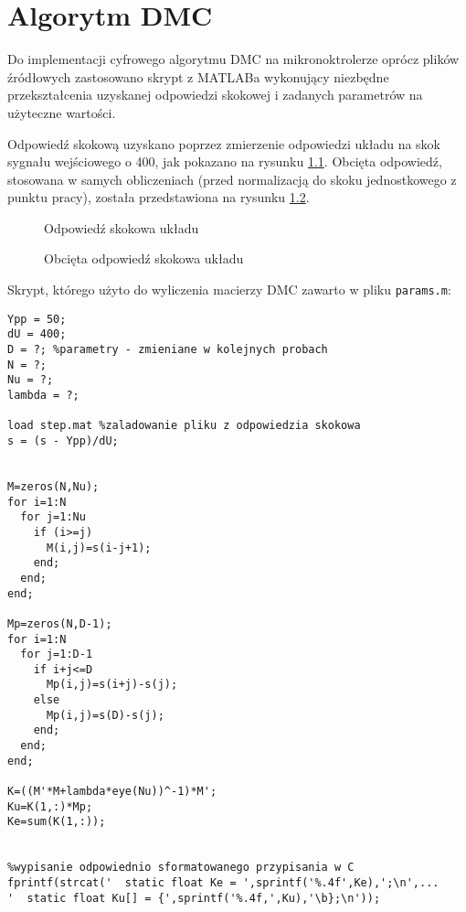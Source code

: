 \begin{figure}[H]
\centering

\end{figure}


\begin{figure}[H]
\centering

\end{figure}

\begin{figure}[H]
\centering

\end{figure}


\chapter{Algorytm DMC}

Do implementacji cyfrowego algorytmu DMC na mikronoktrolerze oprócz plików źródłowych zastosowano skrypt z MATLABa wykonujący niezbędne przekształcenia uzyskanej odpowiedzi skokowej i zadanych parametrów na użyteczne wartości.

Odpowiedź skokową uzyskano poprzez zmierzenie odpowiedzi układu na skok sygnału wejściowego o 400, jak pokazano na rysunku \ref{DMC1}. Obcięta odpowiedź, stosowana w samych obliczeniach (przed normalizacją do skoku jednostkowego z punktu pracy), została przedstawiona na rysunku \ref{DMC2}.


\begin{figure}[H]
	\centering
	
	\caption{Odpowiedź skokowa układu}
	\label{DMC1}
\end{figure}

\begin{figure}[H]
	\centering
	
	\caption{Obcięta odpowiedź skokowa układu}
	\label{DMC2}
\end{figure}

Skrypt, którego użyto do wyliczenia macierzy DMC zawarto w pliku \verb|params.m|:

\begin{lstlisting}[style=Matlab-editor]
Ypp = 50;
dU = 400;
D = ?; %parametry - zmieniane w kolejnych probach
N = ?;
Nu = ?;
lambda = ?;

load step.mat %zaladowanie pliku z odpowiedzia skokowa
s = (s - Ypp)/dU;


M=zeros(N,Nu);
for i=1:N
  for j=1:Nu
    if (i>=j)
      M(i,j)=s(i-j+1);
    end;
  end;
end;

Mp=zeros(N,D-1);
for i=1:N
  for j=1:D-1
    if i+j<=D
      Mp(i,j)=s(i+j)-s(j);
    else
      Mp(i,j)=s(D)-s(j);
    end;      
  end;
end;

K=((M'*M+lambda*eye(Nu))^-1)*M';
Ku=K(1,:)*Mp;
Ke=sum(K(1,:));


%wypisanie odpowiednio sformatowanego przypisania w C
fprintf(strcat('  static float Ke = ',sprintf('%.4f',Ke),';\n',...
'  static float Ku[] = {',sprintf('%.4f,',Ku),'\b};\n'));

\end{lstlisting} 

